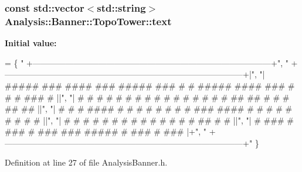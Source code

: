 \subsubsection[{\texorpdfstring{text}{text}}]{\setlength{\rightskip}{0pt plus 5cm}const std\+::vector$<$std\+::string$>$ Analysis\+::\+Banner\+::\+Topo\+Tower\+::text\hspace{0.3cm}{\ttfamily [static]}}\hypertarget{namespaceAnalysis_1_1Banner_1_1TopoTower_aa34a322d74236067c435f60c9bd76847}{}\label{namespaceAnalysis_1_1Banner_1_1TopoTower_aa34a322d74236067c435f60c9bd76847}
{\bfseries Initial value\+:}
\begin{DoxyCode}
= \{ \textcolor{stringliteral}{" +---------------------------------------------------------------------------------------+"},
                             \textcolor{stringliteral}{"
      +---------------------------------------------------------------------------------------+|"},
                             \textcolor{stringliteral}{"| #####  ###  ####   ###  #####  ###  #   # ##### ####     ###     #  #   # 
       ###     #  ||"},
                             \textcolor{stringliteral}{"|   #   #   # #   # #   #   #   #   # #   # #     #   #   #  ##   ##   # #  #
        ##   ##  ||"},
                             \textcolor{stringliteral}{"|   #   #   # ####  #   #   #   #   # # # # ###   ####    # # #    #    #   #
       # #    #  ||"},
                             \textcolor{stringliteral}{"|   #   #   # #     #   #   #   #   # # # # #     #  %
       ##  #    #  ||"},
                             \textcolor{stringliteral}{"|   #    ###  #      ###    #    ###   ###  ##### #   %
       ###  # ### |+"},
                             \textcolor{stringliteral}{"
      +---------------------------------------------------------------------------------------+"} \}
\end{DoxyCode}


Definition at line 27 of file Analysis\+Banner.\+h.

